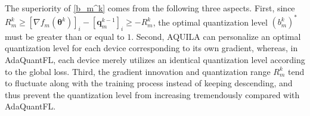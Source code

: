 \documentclass[lettersize,journal]{IEEEtran}
\begin{document}
The superiority of \eqref{b_m^k} comes from the following three aspects. First, since $R_m^k \geqslant [\nabla f_m(\boldsymbol{\theta}^k)]_i - [\boldsymbol{q}_{m}^{k-1}]_i \geqslant - R_m^k$, the optimal quantization level $(b_m^k)^*$ must be greater than or equal to $1$. 
Second, AQUILA can personalize an optimal quantization level for each device corresponding to its own gradient, whereas, in AdaQuantFL, each device merely utilizes an identical quantization level according to the global loss.
Third, the gradient innovation and quantization range $R_m^k$ tend to fluctuate along with the training process instead of keeping descending, and thus prevent the quantization level from increasing tremendously compared with AdaQuantFL. 


\end{document}
